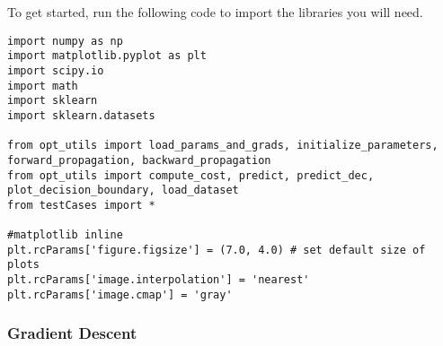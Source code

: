 To get started, run the following code to import the libraries you will need.
\begin{verbatim}
import numpy as np
import matplotlib.pyplot as plt
import scipy.io
import math
import sklearn
import sklearn.datasets

from opt_utils import load_params_and_grads, initialize_parameters, forward_propagation, backward_propagation
from opt_utils import compute_cost, predict, predict_dec, plot_decision_boundary, load_dataset
from testCases import *

#matplotlib inline
plt.rcParams['figure.figsize'] = (7.0, 4.0) # set default size of plots
plt.rcParams['image.interpolation'] = 'nearest'
plt.rcParams['image.cmap'] = 'gray'
\end{verbatim}



\subsubsection{Gradient Descent}

